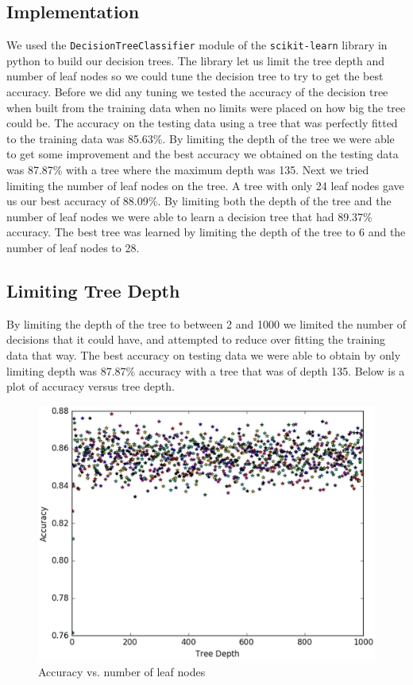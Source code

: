 \documentclass{article} %
\begin{document}
\subsection{Implementation}
We used the \texttt{DecisionTreeClassifier} module of the \texttt{scikit-learn}
library in python to build our decision trees. The library let us limit the tree
depth and number of leaf nodes so we could tune the decision tree to try to get
the best accuracy. Before we did any tuning we tested the accuracy of the decision
tree when built from the training data when no limits were placed on how big the
tree could be. The accuracy on the testing data using a tree that was perfectly
fitted to the training data was 85.63\%. By limiting the depth of the tree we were
able to get some improvement and the best accuracy we obtained on the testing data
was 87.87\% with a tree where the maximum depth was 135. Next we tried limiting
the number of leaf nodes on the tree. A tree with only 24 leaf nodes gave us our
best accuracy of 88.09\%. By limiting both the depth of the tree and the number
of leaf nodes we were able to learn a decision tree that had 89.37\% accuracy.
The best tree was learned by limiting the depth of the tree to 6 and the number
of leaf nodes to 28.

\subsection{Limiting Tree Depth}
By limiting the depth of the tree to between 2 and 1000 we limited the number of
decisions that it could have, and attempted to reduce over fitting the training
data that way. The best accuracy on testing data we were able to obtain by only
limiting depth was 87.87\% accuracy with a tree that was of depth 135. Below is
a plot of accuracy versus tree depth.

\begin{figure}[H]
\includegraphics[scale=.5]{accuracy-vs-depth}
\caption{Accuracy vs. number of leaf nodes}
\end{figure}
\end{document}
